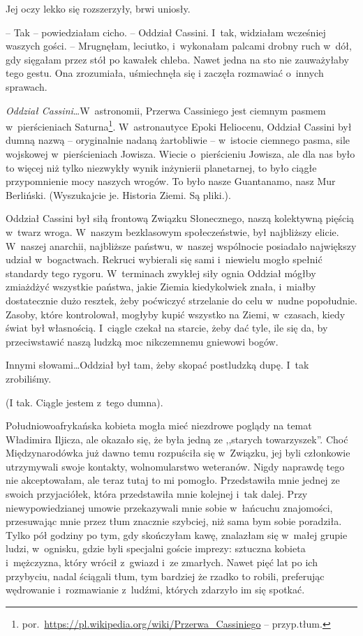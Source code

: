 \documentclass[oneside,polish,11pt,sfheadings]{mwbk}
\begin{document}
Jej oczy lekko się rozszerzyły, brwi uniosły.

-- Tak -- powiedziałam cicho. -- Oddział Cassini. I~tak, widziałam
wcześniej waszych gości. -- Mrugnęłam, leciutko, i~wykonałam palcami
drobny ruch w~dół, gdy sięgałam przez stół po kawałek chleba. Nawet
jedna na sto nie zauważyłaby tego gestu. Ona zrozumiała, uśmiechnęła się
i zaczęła rozmawiać o~innych sprawach.

\textit{Oddział Cassini}\ldots  W~astronomii, Przerwa Cassiniego jest ciemnym
pasmem w~pierścieniach
Saturna\footnote{por.~\url{https://pl.wikipedia.org/wiki/Przerwa\_Cassiniego} -- przyp.tłum.}. W~astronautyce Epoki Heliocenu, Oddział Cassini był dumną
nazwą -- oryginalnie nadaną żartobliwie -- w~istocie ciemnego pasma, sile
wojskowej w~pierścieniach Jowisza. Wiecie o~pierścieniu Jowisza, ale dla
nas było to więcej niż tylko niezwykły wynik inżynierii planetarnej, to
było ciągłe przypomnienie mocy naszych wrogów. To było nasze Guantanamo,
nasz Mur Berliński. (Wyszukajcie je. Historia Ziemi. Są pliki.).

Oddział Cassini był siłą frontową Związku Słonecznego, naszą kolektywną
pięścią w~twarz wroga. W~naszym bezklasowym społeczeństwie, był
najbliższy elicie. W~naszej anarchii, najbliższe państwu, w~naszej
wspólnocie posiadało największy udział w~bogactwach. Rekruci wybierali
się sami i~niewielu mogło spełnić standardy tego rygoru. W~terminach
zwykłej siły ognia Oddział mógłby zmiażdżyć wszystkie państwa, jakie
Ziemia kiedykolwiek znała, i~miałby dostatecznie dużo resztek, żeby
poćwiczyć strzelanie do celu w~nudne popołudnie. Zasoby, które
kontrolował, mogłyby kupić wszystko na Ziemi, w~czasach, kiedy świat był
własnością. I~ciągle czekał na starcie, żeby dać tyle, ile się da, by
przeciwstawić naszą ludzką moc nikczemnemu gniewowi bogów.

Innymi słowami\ldots  Oddział był tam, żeby skopać postludzką dupę. I~tak
zrobiliśmy.

(I tak. Ciągle jestem z~tego dumna).

Południowoafrykańska kobieta mogła mieć niezdrowe poglądy na temat
Władimira Iljicza, ale okazało się, że była jedną ze ,,starych
towarzyszek''. Choć Międzynarodówka już dawno temu rozpuściła się w~Związku, jej byli członkowie utrzymywali swoje kontakty, wolnomularstwo
weteranów. Nigdy naprawdę tego nie akceptowałam, ale teraz tutaj to mi
pomogło. Przedstawiła mnie jednej ze swoich przyjaciółek, która
przedstawiła mnie kolejnej i~tak dalej. Przy niewypowiedzianej umowie
przekazywali mnie sobie w~łańcuchu znajomości, przesuwając mnie przez
tłum znacznie szybciej, niż sama bym sobie poradziła. Tylko pół godziny
po tym, gdy skończyłam kawę, znalazłam się w~małej grupie ludzi, w~ognisku, gdzie byli specjalni goście imprezy: sztuczna kobieta i~mężczyzna, który wrócił z~gwiazd i~ze zmarłych. Nawet pięć lat po ich
przybyciu, nadal ściągali tłum, tym bardziej że rzadko to robili,
preferując wędrowanie i~rozmawianie z~ludźmi, których zdarzyło im się
spotkać.
\end{document}
